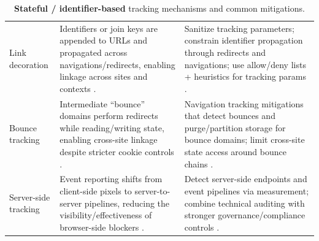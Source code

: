 \begin{table}[t]
\begin{tabularx}{\textwidth}{p{2.8cm} Y Y}
Link decoration &
Identifiers or join keys are appended to URLs and propagated across navigations/redirects, enabling linkage across sites and contexts \cite{munirPURLSafeEffective2024,bekosHitchhikersGuideFacebook2023}. &
Sanitize tracking parameters; constrain identifier propagation through redirects and navigations; use allow/deny lists + heuristics for tracking params \cite{munirPURLSafeEffective2024}. \\

Bounce tracking &
Intermediate “bounce” domains perform redirects while reading/writing state, enabling cross-site linkage despite stricter cookie controls \cite{braveprivacyteamUnlinkableBouncingMore2022,kellyBounceTrackingMitigations2022}. &
Navigation tracking mitigations that detect bounces and purge/partition storage for bounce domains; limit cross-site state access around bounce chains \cite{braveprivacyteamUnlinkableBouncingMore2022,kellyBounceTrackingMitigations2022}. \\

Server-side tracking &
Event reporting shifts from client-side pixels to server-to-server pipelines, reducing the visibility/effectiveness of browser-side blockers \cite{fouadDevilDetailsDetection2024,fraihiClientsideServersideTracking2024}. &
Detect server-side endpoints and event pipelines via measurement; combine technical auditing with stronger governance/compliance controls \cite{fouadDevilDetailsDetection2024,fraihiClientsideServersideTracking2024}. \\

\bottomrule
\end{tabularx}
\caption{\textbf{Stateful / identifier-based} tracking mechanisms and common mitigations.}
\label{tab:appendix-stateful-tracking}
\end{table}

